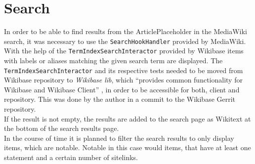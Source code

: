 \section{Search}
In order to be able to find results from the ArticlePlaceholder in the MediaWiki search, it was necessary to use the \texttt{\justify SearchHookHandler} provided by MediaWiki. \citep{wiki:25} \\
With the help of the \texttt{\justify TermIndexSearchInteractor} provided by Wikibase items with labels or aliases matching the given search term are displayed. The \texttt{\justify TermIndexSearchInteractor} and its respective tests needed to be moved from Wikibase repository to \textit{Wikibase lib}, which ``provides common functionality for Wikibase and Wikibase Client'' \citep{wiki:28}, in order to be accessible for both, client and repository. This was done by the author in a commit to the Wikibase Gerrit repository. \citep{gerrit:01}
\\
If the result is not empty, the results are added to the search page as Wikitext at the bottom of the search results page. \\
In the course of time it is planned to filter the search results to only display items, which are notable. Notable in this case would items, that have at least one statement and a certain number of sitelinks.
